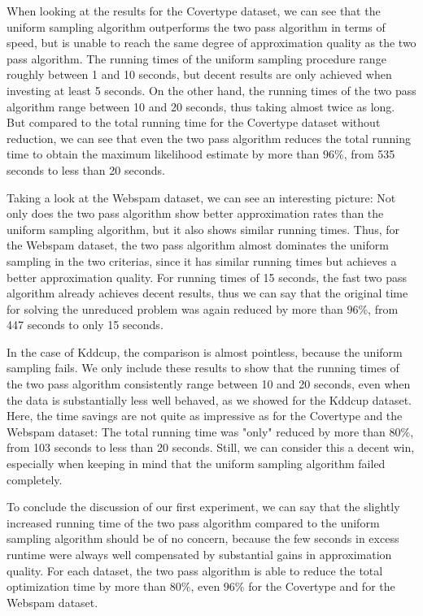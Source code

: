When looking at the results for the Covertype dataset, we can see
that the uniform sampling algorithm outperforms the two pass
algorithm in terms of speed, but is unable to reach the same degree
of approximation quality as the two pass algorithm. The running times of
the uniform sampling procedure range roughly between 1 and
10 seconds, but decent results are only achieved when investing
at least 5 seconds. On the other hand, the running times of the
two pass algorithm range between 10 and 20 seconds, thus taking
almost twice as long. But compared to the total running time
for the Covertype dataset without reduction, we can see that
even the two pass algorithm reduces the total running time
to obtain the maximum likelihood estimate
by more than $96\%$, from 535 seconds to less than 20 seconds.

Taking a look at the Webspam dataset, we can see an interesting
picture: Not only does the two pass algorithm show better
approximation rates than the uniform sampling algorithm, but
it also shows similar running times. Thus, for the Webspam dataset,
the two pass algorithm almost dominates the uniform sampling
in the two criterias, since it has similar running times but
achieves a better approximation quality.
For running times of 15 seconds, the fast two pass algorithm already
achieves decent results, thus we can say that the
original time for solving the unreduced problem was again reduced
by more than $96\%$, from 447 seconds to only 15 seconds.

In the case of Kddcup, the comparison is almost pointless, because
the uniform sampling fails. We only include these results to show
that the running times of the two pass algorithm consistently
range between 10 and 20 seconds, even when the data is
substantially less well behaved, as we showed for the
Kddcup dataset. Here, the time savings are not quite as impressive
as for the Covertype and the Webspam dataset:
The total running time was "only" reduced by more than $80\%$,
from 103 seconds to less than 20 seconds. Still, we can
consider this a decent win, especially when keeping
in mind that the uniform sampling algorithm failed completely.

To conclude the discussion of our first experiment, we can
say that the slightly increased running time of the two
pass algorithm compared to the uniform sampling algorithm
should be of no concern, because the few seconds in excess
runtime were always well compensated by substantial
gains in approximation quality. For each dataset,
the two pass algorithm is able to reduce the total
optimization time by more than $80\%$, even $96\%$ for
the Covertype and for the Webspam dataset.

